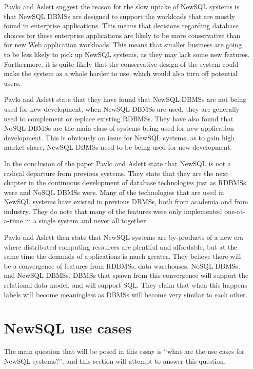\documentclass[10pt, conference]{IEEEtran}
\begin{document}
Pavlo and Aslett suggest the reason for the slow uptake of NewSQL systems is that NewSQL DBMSs are designed to support the workloads that are mostly found in enterprise applications. This means that decisions regarding database choices for these enterprise applications are likely to be more conservative than for new Web application workloads. This means that smaller business are going to be less likely to pick up NewSQL systems, as they may lack some new features. Furthermore, it is quite likely that the conservative design of the system could make the system as a whole harder to use, which would also turn off potential users.

Pavlo and Aslett state that they have found that NewSQL DBMSs are not being used for new development, when NewSQL DBMSs are used, they are generally used to complement or replace existing RDBMSs. They have also found that NoSQL DBMSs are the main class of systems being used for new application development. This is obviously an issue for NewSQL systems, as to gain high market share, NewSQL DBMSs need to be being used for new development.

In the conclusion of the paper Pavlo and Aslett state that NewSQL is not a radical departure from previous systems. They state that they are the next chapter in the continuous development of database technologies just as RDBMSs were and NoSQL DBMSs were. Many of the technologies that are used in NewSQL systems have existed in previous DBMSs, both from academia and from industry. They do note that many of the features were only implemented one-at-a-time in a single system and never all together.

Pavlo and Aslett then state that NewSQL systems are by-products of a new era where distributed computing resources are plentiful and affordable, but at the same time the demands of applications is much greater. They believe there will be a convergence of features from RDBMSs, data warehouses, NoSQL DBMSs, and NewSQL DBMSs. DBMSs that spawn from this convergence will support the relational data model, and will support SQL. They claim that when this happens labels will become meaningless as DBMSs will become very similar to each other.

\section{NewSQL use cases}

The main question that will be posed in this essay is ``what are the use cases for NewSQL systems?'', and this section will attempt to answer this question.
\end{document}
